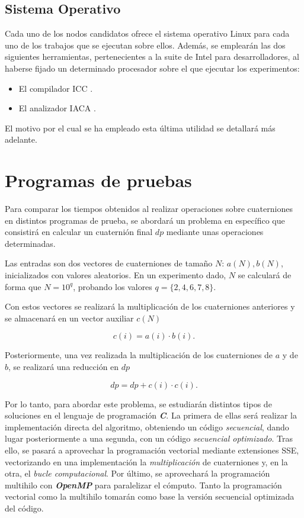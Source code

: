 \documentclass[conference]{IEEEtran}
\begin{document}
\subsection{Sistema Operativo}

Cada uno de los nodos candidatos ofrece el sistema operativo Linux para cada uno de los trabajos que se ejecutan sobre ellos. Además, se emplearán las dos siguientes herramientas, pertenecientes a la suite de Intel para desarrolladores, al haberse fijado un determinado procesador sobre el que ejecutar los experimentos:
\begin{itemize}
    \item El compilador ICC \cite{icc}.
    \item El analizador IACA \cite{iacaDescarga}. 
\end{itemize}
El motivo por el cual se ha empleado esta última utilidad se detallará más adelante.

\section{Programas de pruebas} \label{tipoExperimento}
Para comparar los tiempos obtenidos al realizar operaciones sobre cuaterniones en distintos programas de prueba, se abordará un problema en específico que consistirá en calcular un cuaternión final $dp$ mediante unas operaciones determinadas.

Las entradas son dos vectores de cuaterniones de tamaño $N$: $a(N), b(N)$, inicializados con valores aleatorios. En un experimento dado, $N$ se calculará de forma que $N = 10^{q}$, probando los valores $q = \{2, 4, 6, 7, 8\}$.

Con estos vectores se realizará la multiplicación de los cuaterniones anteriores y se almacenará en un vector auxiliar $c(N)$

\begin{equation*}
    c(i) = a(i) \cdot b(i).
\end{equation*}

Posteriormente, una vez realizada la multiplicación de los cuaterniones de $a$ y de $b$, se realizará una reducción en $dp$

\begin{equation*}
    dp = dp + c(i) \cdot c(i).
\end{equation*}

Por lo tanto, para abordar este problema, se estudiarán distintos tipos de soluciones en el lenguaje de programación \textbf{\textit{C}}. La primera de ellas será realizar la implementación directa del algoritmo, obteniendo un código \textit{secuencial}, dando lugar posteriormente a una segunda, con un código \textit{secuencial optimizado}. Tras ello, se pasará a aprovechar la programación vectorial mediante extensiones SSE, vectorizando en una implementación la \textit{multiplicación} de cuaterniones y, en la otra, el \textit{bucle computacional}. Por último, se aprovechará la programación multihilo con \textit{\textbf{OpenMP}} para paralelizar el cómputo. Tanto la programación vectorial como la multihilo tomarán como base la versión secuencial optimizada del código.
\end{document}
